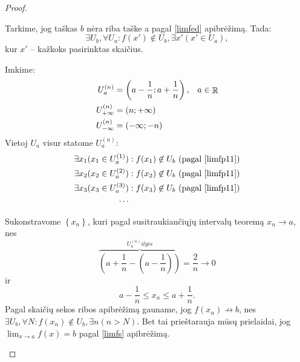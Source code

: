 \begin{prop}
\begin{proof}
\begin{description}
        Tarkime, jog taškas $b$ nėra riba taške a pagal \ref{limfed}
        apibrėžimą. Tada:
        \begin{equation}
          \exists U_{b}, \forall U_{a} :%
            f(x') \not\in U_{b}, \exists x' (x' \in U_{a}),
          \label{limfp11}
        \end{equation}
        kur $x'$ – kažkoks pasirinktas skaičius.

        Imkime:
        \begin{align*}
          U ^{(n)} _{a} &= \left( a - \frac{1}{n}; a + \frac{1}{n} \right),%
            &a \in \RSET \\
          U ^{(n)} _{+\infty} &= (n; +\infty) \\
          U ^{(n)} _{-\infty} &= (-\infty; -n)
        \end{align*}
        Vietoj $U_{a}$ visur statome $U ^{(n)} _{a}$:
        \begin{align*}
          \exists x_{1} (x_{1} \in U _{a} ^{(1)}) &:%
            f(x_{1}) \not\in U_{b}%
            \text{ (pagal \ref{limfp11})} \\
          \exists x_{2} (x_{2} \in U _{a} ^{(2)}) &:%
            f(x_{2}) \not\in U_{b}%
            \text{ (pagal \ref{limfp11})} \\
          \exists x_{3} (x_{3} \in U _{a} ^{(3)}) &:%
            f(x_{3}) \not\in U_{b}%
            \text{ (pagal \ref{limfp11})} \\
          \cdots
        \end{align*}

        Sukonstravome $\left\{ x_{n} \right\}$, kuri pagal susitraukiančiųjų
        intervalų teoremą $x_{n} \to a$, nes
        \[
        \overbrace{\left(a+\frac{1}{n} - \left(a-\frac{1}{n}\right)\right)%
          }^{U ^{(n)} _{a} ilgis} = \frac{2}{n} \to 0
        \]
        ir
        \[
        a - \frac{1}{n} \leq x_{n} \leq a + \frac{1}{n}.
        \]
        Pagal skaičių sekos ribos apibrėžimą gauname, jog 
        $f(x_{n}) \not\to b$, nes $\exists U_{b}, \forall N:%
        f(x_{n}) \not\in U_{b}, \exists n (n > N)$. Bet tai prieštarauja
        mūsų prielaidai, jog $\lim_{x \to a} f(x) = b$ pagal \ref{limfs}
        apibrėžimą.
    \end{description}
  \end{proof}
\end{prop}
